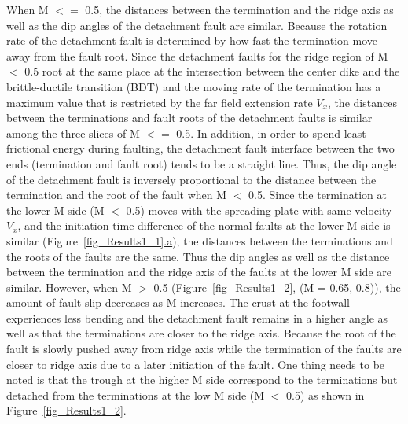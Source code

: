 When M $<=$ 0.5, the distances between the termination and the ridge axis as well as the dip angles of the detachment fault are similar. Because the rotation rate of the detachment fault is determined by how fast the termination move away from the fault root. Since the detachment faults for the ridge region of M $<$ 0.5 root at the same place at the intersection between the center dike and the brittle-ductile transition (BDT) and the moving rate of the termination has a maximum value that is restricted by the far field extension rate $V_{x}$, the distances between the terminations and fault roots of the detachment faults is similar among the three slices of M $<=$ 0.5. In addition, in order to spend least frictional energy during faulting, the detachment fault interface between the two ends (termination and fault root) tends to be a straight line. Thus, the dip angle of the detachment fault is inversely proportional to the distance between the termination and the root of the fault when M $<$ 0.5. Since the termination at the lower M side (M $<$ 0.5) moves with the spreading plate with same velocity $V_{x}$, and the initiation time difference of the normal faults at the lower M side is similar (Figure~\hyperref[fig_Results1_1]{\ref{fig_Results1_1}.a}), the distances between the terminations and the roots of the faults are the same. %
Thus the dip angles as well as the distance between the termination and the ridge axis of the faults at the lower M side are similar. However, when M $>$ 0.5 (Figure~\hyperref[fig_Results1_2]{\ref{fig_Results1_2}, (M = 0.65, 0.8)}), the amount of fault slip decreases as M increases. The crust at the footwall experiences less bending and the detachment fault remains in a higher angle as well as that the terminations are closer to the ridge axis. Because the root of the fault is slowly pushed away from ridge axis while the termination of the faults are closer to ridge axis due to a later initiation of the fault. %
One thing needs to be noted is that the trough at the higher M side correspond to the terminations but detached from the terminations at the low M side (M $<$ 0.5) as shown in Figure~\hyperref[fig_Results1_2]{\ref{fig_Results1_2}}.

